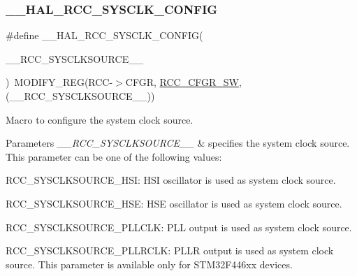 \subsubsection{\texorpdfstring{\+\_\+\+\_\+\+H\+A\+L\+\_\+\+R\+C\+C\+\_\+\+S\+Y\+S\+C\+L\+K\+\_\+\+C\+O\+N\+F\+IG}{\_\_HAL\_RCC\_SYSCLK\_CONFIG}}
{\footnotesize\ttfamily \#define \+\_\+\+\_\+\+H\+A\+L\+\_\+\+R\+C\+C\+\_\+\+S\+Y\+S\+C\+L\+K\+\_\+\+C\+O\+N\+F\+IG(\begin{DoxyParamCaption}\item[{}]{\+\_\+\+\_\+\+R\+C\+C\+\_\+\+S\+Y\+S\+C\+L\+K\+S\+O\+U\+R\+C\+E\+\_\+\+\_\+ }\end{DoxyParamCaption})~M\+O\+D\+I\+F\+Y\+\_\+\+R\+EG(R\+CC-\/$>$C\+F\+GR, \mbox{\hyperlink{group___peripheral___registers___bits___definition_ga0eea5e5f7743a7e8995b8beeb18355c1}{R\+C\+C\+\_\+\+C\+F\+G\+R\+\_\+\+SW}}, (\+\_\+\+\_\+\+R\+C\+C\+\_\+\+S\+Y\+S\+C\+L\+K\+S\+O\+U\+R\+C\+E\+\_\+\+\_\+))}



Macro to configure the system clock source. 


\begin{DoxyParams}{Parameters}
{\em \+\_\+\+\_\+\+R\+C\+C\+\_\+\+S\+Y\+S\+C\+L\+K\+S\+O\+U\+R\+C\+E\+\_\+\+\_\+} & specifies the system clock source. This parameter can be one of the following values\+:
\begin{DoxyItemize}
\item R\+C\+C\+\_\+\+S\+Y\+S\+C\+L\+K\+S\+O\+U\+R\+C\+E\+\_\+\+H\+SI\+: H\+SI oscillator is used as system clock source.
\item R\+C\+C\+\_\+\+S\+Y\+S\+C\+L\+K\+S\+O\+U\+R\+C\+E\+\_\+\+H\+SE\+: H\+SE oscillator is used as system clock source.
\item R\+C\+C\+\_\+\+S\+Y\+S\+C\+L\+K\+S\+O\+U\+R\+C\+E\+\_\+\+P\+L\+L\+C\+LK\+: P\+LL output is used as system clock source.
\item R\+C\+C\+\_\+\+S\+Y\+S\+C\+L\+K\+S\+O\+U\+R\+C\+E\+\_\+\+P\+L\+L\+R\+C\+LK\+: P\+L\+LR output is used as system clock source. This parameter is available only for S\+T\+M32\+F446xx devices. 
\end{DoxyItemize}\\
\hline
\end{DoxyParams}
